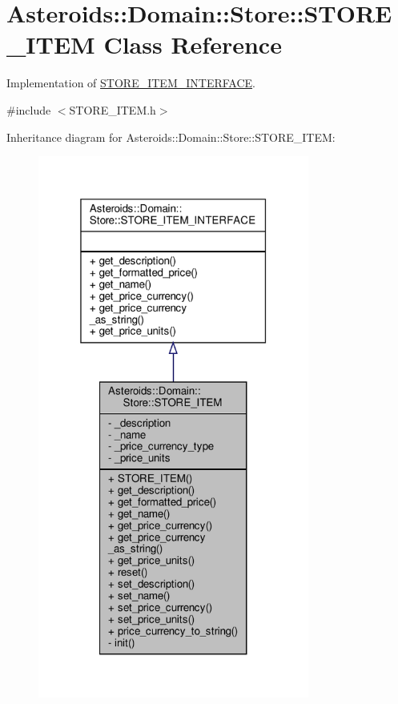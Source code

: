 \hypertarget{classAsteroids_1_1Domain_1_1Store_1_1STORE__ITEM}{}\section{Asteroids\+:\+:Domain\+:\+:Store\+:\+:S\+T\+O\+R\+E\+\_\+\+I\+T\+EM Class Reference}
\label{classAsteroids_1_1Domain_1_1Store_1_1STORE__ITEM}


Implementation of \hyperlink{classAsteroids_1_1Domain_1_1Store_1_1STORE__ITEM__INTERFACE}{S\+T\+O\+R\+E\+\_\+\+I\+T\+E\+M\+\_\+\+I\+N\+T\+E\+R\+F\+A\+CE}.  




{\ttfamily \#include $<$S\+T\+O\+R\+E\+\_\+\+I\+T\+E\+M.\+h$>$}



Inheritance diagram for Asteroids\+:\+:Domain\+:\+:Store\+:\+:S\+T\+O\+R\+E\+\_\+\+I\+T\+EM\+:\nopagebreak
\begin{figure}[H]
\begin{center}
\leavevmode
\includegraphics[width=253pt]{classAsteroids_1_1Domain_1_1Store_1_1STORE__ITEM__inherit__graph}
\end{center}
\end{figure}



